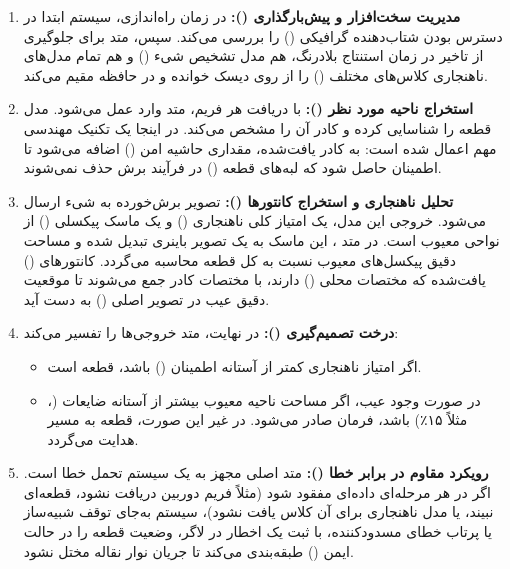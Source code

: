 \documentclass{article}
\begin{document}
\begin{enumerate}
	\item \textbf{مدیریت سخت‌افزار و پیش‌بارگذاری ():} در زمان راه‌اندازی، سیستم ابتدا در دسترس بودن شتاب‌دهنده گرافیکی () را بررسی می‌کند. سپس، متد  برای جلوگیری از تاخیر در زمان استنتاج بلادرنگ، هم مدل تشخیص شیء  () و هم تمام مدل‌های ناهنجاری کلاس‌های مختلف () را از روی دیسک خوانده و در حافظه مقیم می‌کند.
	
	\item \textbf{استخراج ناحیه مورد نظر ():} با دریافت هر فریم، متد  وارد عمل می‌شود. مدل  قطعه را شناسایی کرده و کادر آن را مشخص می‌کند. در اینجا یک تکنیک مهندسی مهم اعمال شده است: به کادر یافت‌شده، مقداری حاشیه امن () اضافه می‌شود تا اطمینان حاصل شود که لبه‌های قطعه () در فرآیند برش حذف نمی‌شوند.
	
	\item \textbf{تحلیل ناهنجاری و استخراج کانتورها ():} تصویر برش‌خورده به شیء  ارسال می‌شود. خروجی این مدل، یک امتیاز کلی ناهنجاری () و یک ماسک پیکسلی () از نواحی معیوب است. در متد ، این ماسک به یک تصویر باینری تبدیل شده و مساحت دقیق پیکسل‌های معیوب نسبت به کل قطعه محاسبه می‌گردد. کانتورهای () یافت‌شده که مختصات محلی () دارند، با مختصات کادر  جمع می‌شوند تا موقعیت دقیق عیب در تصویر اصلی () به دست آید.
	
	\item \textbf{درخت تصمیم‌گیری ():} در نهایت، متد  خروجی‌ها را تفسیر می‌کند:
	\begin{itemize}
		\item اگر امتیاز ناهنجاری کمتر از آستانه اطمینان () باشد، قطعه  است.
		\item در صورت وجود عیب، اگر مساحت ناحیه معیوب بیشتر از آستانه ضایعات (، مثلاً ۱۵٪) باشد، فرمان  صادر می‌شود. در غیر این صورت، قطعه به مسیر  هدایت می‌گردد.
	\end{itemize}
	
	\item \textbf{رویکرد مقاوم در برابر خطا ():} متد اصلی  مجهز به یک سیستم تحمل خطا است. اگر در هر مرحله‌ای داده‌ای مفقود شود (مثلاً فریم دوربین دریافت نشود،  قطعه‌ای نبیند، یا مدل ناهنجاری برای آن کلاس یافت نشود)، سیستم به‌جای توقف شبیه‌ساز یا پرتاب خطای مسدودکننده، با ثبت یک اخطار در لاگر، وضعیت قطعه را در حالت ایمن () طبقه‌بندی می‌کند تا جریان نوار نقاله مختل نشود.
\end{enumerate}
\end{document}
